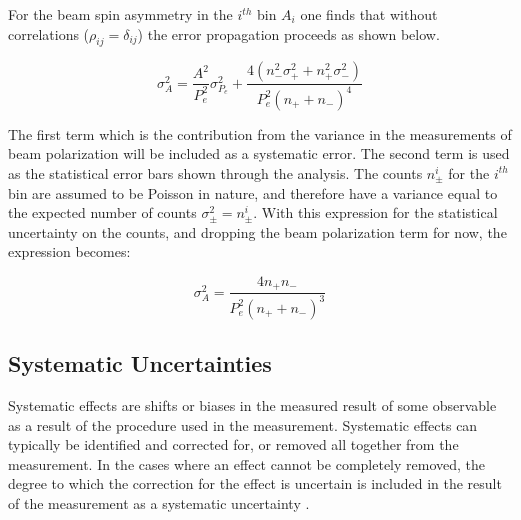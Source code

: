 For the beam spin asymmetry in the $i^{th}$ bin $A_i$ one finds that without correlations ($\rho_{ij} = \delta_{ij}$) the error propagation proceeds as shown below.

\begin{equation}
  \sigma_{A}^{2} = \frac{A^2}{P_{e}^2} \sigma_{P_{e}}^{2} + \frac{4 (n_{-}^{2} \sigma_{+}^{2}  + n_{+}^{2} \sigma_{-}^{2})}{ P_{e}^{2} (n_{+} + n_{-})^4}
\end{equation} 

The first term which is the contribution from the variance in the measurements of beam polarization will be included as a systematic error.  The second term is used as the statistical error bars shown through the analysis.  The counts $n_{\pm}^{i}$ for the $i^{th}$ bin are assumed to be Poisson in nature, and therefore have a variance equal to the expected number of counts $\sigma_{\pm}^{2} = n_{\pm}^{i}$.  With this expression for the statistical uncertainty on the counts, and dropping the beam polarization term for now, the expression becomes: 

\begin{equation}
  \sigma_{A}^{2} = \frac{4n_+ n_-}{P_{e}^{2} (n_+ + n_-)^3}
\end{equation}



\subsection*{Systematic Uncertainties}


Systematic effects are shifts or biases in the measured result of some observable as a result of the procedure used in the measurement.  Systematic effects can typically be identified and corrected for, or removed all together from the measurement.  In the cases where an effect cannot be completely removed, the degree to which the correction for the effect is uncertain is included in the result of the measurement as a systematic uncertainty \cite{misc-barlow:2002}. \\

